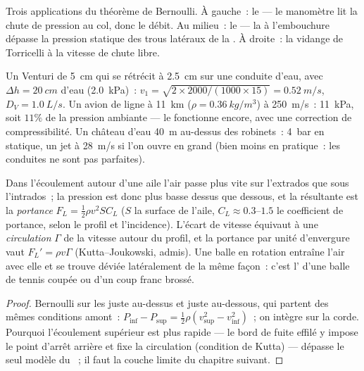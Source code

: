 \begin{omfigure}
{\small Trois applications du théorème de Bernoulli. À gauche~: le  --- le manomètre lit la chute de pression au col, donc le
débit. Au milieu~: le  --- la  à
l'embouchure dépasse la pression statique des trous latéraux de la . À droite~: la vidange de Torricelli à la vitesse de chute libre.}
\end{omfigure}

\begin{example}\label{ex:b2:euler-bernoulli:numbers}
Un Venturi de \qty{5}{cm} qui se rétrécit à \qty{2.5}{cm} sur une conduite d'eau, avec
$\Delta h = \qty{20}{cm}$ d'eau (\qty{2.0}{kPa})~: $v_1 = \sqrt{2 \times 2000/
(1000 \times 15)} = \qty{0.52}{m/s}$, $D_V = \qty{1.0}{L/s}$. Un avion de ligne à
\qty{11}{km} ($\rho = \qty{0.36}{kg/m^3}$) à \qty{250}{m/s}~: 
\qty{11}{kPa}, soit $11\%$ de la pression ambiante --- le  fonctionne
encore, avec une correction de compressibilité. Un château d'eau \qty{40}{m}
au-dessus des robinets~: \qty{4}{bar} en statique, un jet à \qty{28}{m/s} si l'on ouvre
en grand (bien moins en pratique~: les conduites ne sont pas parfaites).
\end{example}

\begin{proposition}\label{prop:b2:euler-bernoulli:lift}
Dans l'écoulement autour d'une aile l'air passe plus vite sur l'extrados
que sous l'intrados~; la pression est donc plus basse
dessus que dessous, et la résultante est la \emph{portance} $F_L =
\tfrac12\rho v^2SC_L$ ($S$ la surface de l'aile, $C_L \approx 0.3$--$1.5$ le coefficient
de portance, selon le profil et l'incidence). L'écart
de vitesse équivaut à une \emph{circulation} $\Gamma$ de la
vitesse autour du profil, et la portance par unité d'envergure vaut $F_L' =
\rho v\Gamma$ (Kutta--Joukowski, admis). Une balle en rotation entraîne l'air
avec elle et se trouve déviée latéralement de la même façon~: c'est l'\emph{} d'une balle de tennis coupée ou d'un coup franc brossé.
\end{proposition}

\begin{proof}
Bernoulli sur les  juste au-dessus et juste au-dessous, qui partent des
mêmes conditions amont~: $P_{\text{inf}} - P_{\text{sup}} = \tfrac12\rho
(v_{\text{sup}}^2 - v_{\text{inf}}^2)$~; on intègre sur la corde. Pourquoi l'écoulement
supérieur est plus rapide --- le bord de fuite effilé y impose le
point d'arrêt arrière et fixe la circulation (condition de Kutta)
--- dépasse le seul modèle du ~; il faut la couche limite
du chapitre suivant.
\end{proof}

